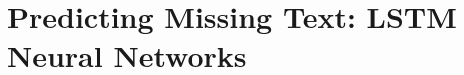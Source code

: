 \documentclass{beamer}
\begin{document}
\section{Predicting Missing Text: LSTM Neural Networks}






\end{document}

